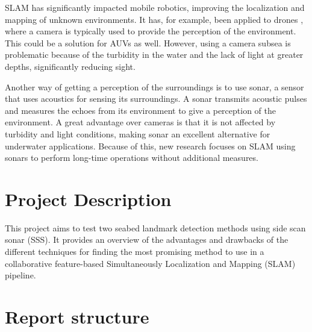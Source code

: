 SLAM has significantly impacted mobile robotics, improving the localization and mapping of unknown environments. It has, for example, been applied to drones \cite{VonStumberg2017FromExploration}, where a camera is typically used to provide the perception of the environment. \cite{Hidalgo2015ReviewTechniques}This could be a solution for AUVs as well. However, using a camera subsea is problematic because of the turbidity in the water and the lack of light at greater depths, significantly reducing sight. 

Another way of getting a perception of the surroundings is to use sonar, a sensor that uses acoustics for sensing its surroundings. A sonar transmits acoustic pulses and measures the echoes from its environment to give a perception of the environment. A great advantage over cameras is that it is not affected by turbidity and light conditions, making sonar an excellent alternative for underwater applications. Because of this, new research focuses on SLAM using sonars to perform long-time operations without additional measures.

\section{Project Description}

This project aims to test two seabed landmark detection methods using side scan sonar (SSS). It provides an overview of the advantages and drawbacks of the different techniques for finding the most promising method to use in a collaborative feature-based Simultaneously Localization and Mapping (SLAM) pipeline.

\section{Report structure}

